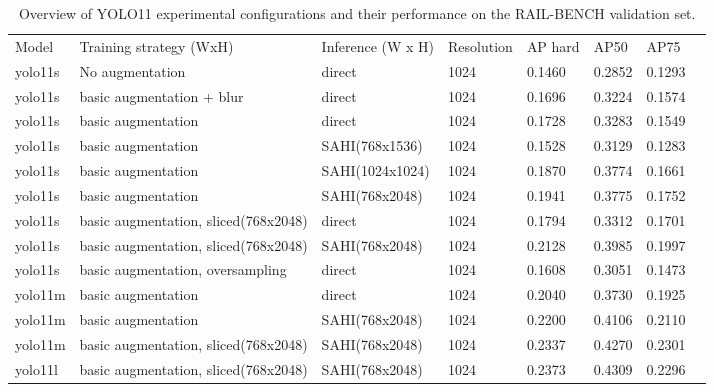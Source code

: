 \begin{table}
\centering
\begin{tabular}{llllllll}
\toprule
        Model & Training strategy (WxH) & Inference (W x H) & Resolution & AP hard & AP50 & AP75  \\ 
        yolo11s & No augmentation & direct & 1024 & 0.1460 & 0.2852 & 0.1293  \\ 
        yolo11s & basic augmentation + blur & direct & 1024 & 0.1696 & 0.3224 & 0.1574  \\ 
        yolo11s & basic augmentation & direct & 1024 & 0.1728 & 0.3283 & 0.1549  \\ 
        yolo11s & basic augmentation & SAHI(768x1536) & 1024 & 0.1528 & 0.3129 & 0.1283  \\ 
        yolo11s & basic augmentation & SAHI(1024x1024) & 1024 & 0.1870 & 0.3774 &  0.1661  \\ 
        yolo11s & basic augmentation & SAHI(768x2048) & 1024 & 0.1941 & 0.3775 & 0.1752  \\ 
        yolo11s & basic augmentation,  sliced(768x2048) & direct & 1024 & 0.1794 & 0.3312 & 0.1701  \\ 
        yolo11s & basic augmentation,  sliced(768x2048) & SAHI(768x2048) & 1024 & 0.2128 & 0.3985 & 0.1997  \\ 
        yolo11s & basic augmentation, oversampling & direct & 1024 & 0.1608 & 0.3051 & 0.1473  \\ 
        \midrule
        yolo11m & basic augmentation & direct & 1024 & 0.2040 & 0.3730 & 0.1925  \\ 
        yolo11m & basic augmentation & SAHI(768x2048) & 1024 & 0.2200 & 0.4106 &  0.2110  \\ 
        yolo11m & basic augmentation,  sliced(768x2048) & SAHI(768x2048) & 1024 & 0.2337 & 0.4270 & 0.2301  \\ 
        \midrule
        yolo11l & basic augmentation,  sliced(768x2048) & SAHI(768x2048) & 1024 & 0.2373 & 0.4309 & 0.2296  \\ 
\bottomrule
\end{tabular}

\caption{Overview of YOLO11 experimental configurations and their performance on the RAIL-BENCH validation set.}
\label{tab:all-yolo-results}
\end{table}


